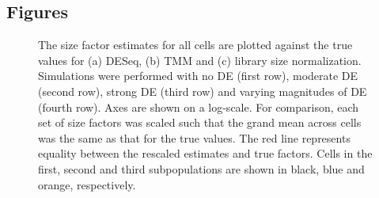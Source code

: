 \documentclass{bmcart}
\begin{document}
\begin{backmatter}





\section*{Figures}
\begin{figure}[!h]
\caption{
    The size factor estimates for all cells are plotted against the true values for (a) DESeq,
        (b) TMM and (c) library size normalization.
    Simulations were performed with no DE (first row), moderate DE (second row), strong DE (third row) and varying magnitudes of DE (fourth row).
    Axes are shown on a log-scale.
    For comparison, each set of size factors was scaled such that the grand mean across cells was the same as that for the true values.
    The red line represents equality between the rescaled estimates and true factors.
    Cells in the first, second and third subpopulations are shown in black, blue and orange, respectively.
}
\label{fig:existing_sim}
\end{figure}


\end{backmatter}
\end{document}
